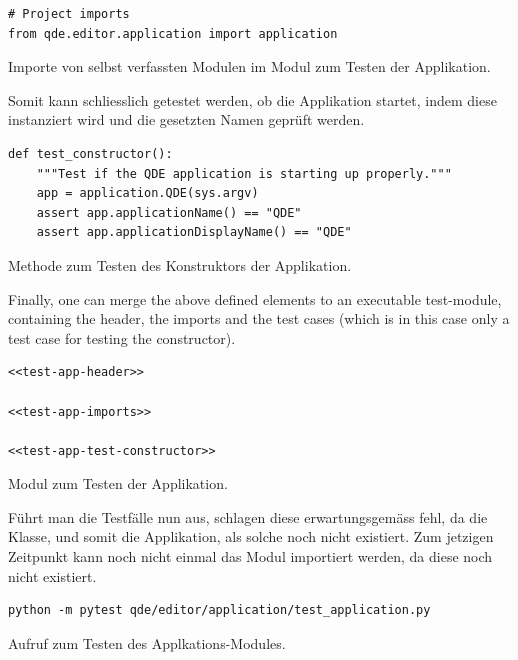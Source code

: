 \documentclass[10pt, openright, notitlepage]{scrreprt}
\begin{document}
\begin{listing}[H]
\begin{verbatim}
# Project imports
from qde.editor.application import application
\end{verbatim}
\caption{\label{test-app-project-imports}
Importe von selbst verfassten Modulen im Modul zum Testen der Applikation.}
\end{listing}

Somit kann schliesslich getestet werden, ob die Applikation startet, indem diese
instanziert wird und die gesetzten Namen geprüft werden.

\begin{listing}[H]
\begin{verbatim}
def test_constructor():
    """Test if the QDE application is starting up properly."""
    app = application.QDE(sys.argv)
    assert app.applicationName() == "QDE"
    assert app.applicationDisplayName() == "QDE"
\end{verbatim}
\caption{\label{test-app-test-constructor}
Methode zum Testen des Konstruktors der Applikation.}
\end{listing}

Finally, one can merge the above defined elements to an executable test-module,
containing the header, the imports and the test cases (which is in this case
only a test case for testing the constructor).

\begin{listing}[H]
\begin{verbatim}
<<test-app-header>>

<<test-app-imports>>

<<test-app-test-constructor>>
\end{verbatim}
\caption{Modul zum Testen der Applikation.}
\end{listing}

Führt man die Testfälle nun aus, schlagen diese erwartungsgemäss fehl, da die
Klasse, und somit die Applikation, als solche noch nicht existiert. Zum jetzigen
Zeitpunkt kann noch nicht einmal das Modul importiert werden, da diese noch
nicht existiert.

\begin{listing}[H]
\begin{verbatim}
python -m pytest qde/editor/application/test_application.py
\end{verbatim}
\caption{Aufruf zum Testen des Applkations-Modules.}
\end{listing}
\end{document}
